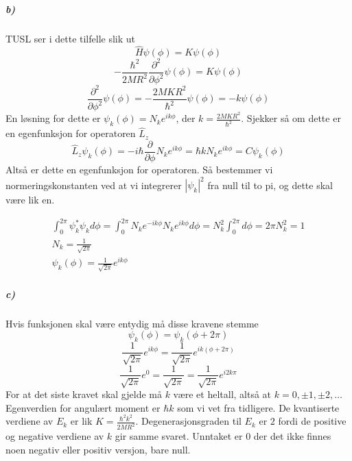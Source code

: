 \documentclass[11pt, A4paper,norsk]{article}
\begin{document}
			\subparagraph{b)}
				\begin{flushleft}
TUSL ser i dette tilfelle slik ut
$$\hat{H} \psi(\phi) = K \psi(\phi)$$
$$- \frac{\hbar^2}{2MR^2} \frac{\partial^2}{\partial \phi^2} \psi(\phi) = K \psi(\phi)$$
$$\frac{\partial^2}{\partial \phi^2} \psi(\phi) = - \frac{2MKR^2}{\hbar^2} \psi(\phi) = - k \psi(\phi)$$
En løsning for dette er $\psi_k(\phi) = N_k e^{i k \phi}$, der $k = \frac{2 M K R^2}{\hbar^2}$. 
Sjekker så om dette er en egenfunksjon for operatoren $\hat{L}_z$
$$\hat{L}_z \psi_k(\phi) = - i \hbar \frac{\partial}{\partial \phi} N_k e^{i k \phi} = \hbar k N_k e^{i k \phi} = C \psi_k(\phi)$$
Altså er dette en egenfunksjon for operatoren. Så bestemmer vi normeringskonstanten ved at vi integrerer $|\psi_k|^2$ fra null til to pi, og dette skal være lik en.
				\end{flushleft}
				\begin{gather*}
\int_{0}^{2 \pi} \psi_k^{*} \psi_k d\phi = \int_{0}^{2 \pi} N_k e^{- i k \phi} N_k e^{i k \phi} d\phi = N_k^2 \int_{0}^{2 \pi} d\phi = 2 \pi N_k^2 = 1 \\
N_k = \frac{1}{\sqrt{2 \pi}} \\
\psi_k(\phi) = \frac{1}{\sqrt{2 \pi}} e^{i k \phi}
				\end{gather*}








			\subparagraph{c)}
				\begin{flushleft}
Hvis funksjonen skal være entydig må disse kravene stemme
$$\psi_k(\phi) = \psi_k(\phi + 2 \pi)$$
$$\frac{1}{\sqrt{2 \pi}} e^{i k \phi} = \frac{1}{\sqrt{2 \pi}} e^{i k (\phi + 2 \pi)}$$
$$\frac{1}{\sqrt{2 \pi}} e^{0} = \frac{1}{\sqrt{2 \pi}} = \frac{1}{\sqrt{2 \pi}} e^{i 2 k \pi}$$
For at det siste kravet skal gjelde må $k$ være et heltall, altså at $k = 0, \pm 1, \pm 2, \dots$
Egenverdien for angulært moment er $\hbar k$ som vi vet fra tidligere.
De kvantiserte verdiene av $E_k$ er lik $K = \frac{\hbar^2 k^2}{2MR^2}$.
Degenerasjonsgraden til $E_k$ er $2$ fordi de positive og negative verdiene av $k$ gir samme svaret. Unntaket er $0$ der det ikke finnes noen negativ eller positiv versjon, bare null.
				\end{flushleft}
\end{document}

